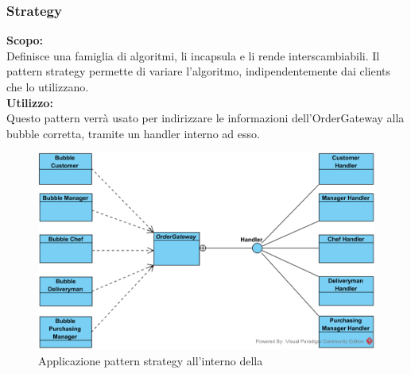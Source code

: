 \subsubsection{Strategy}
\textbf{Scopo:} \\
Definisce una famiglia di algoritmi, li incapsula e li rende interscambiabili. Il pattern strategy permette di variare l'algoritmo, indipendentemente dai clients che lo utilizzano.\\
\textbf{Utilizzo:} \\
Questo pattern verrà usato per indirizzare le informazioni dell'OrderGateway alla bubble corretta, tramite un handler interno ad esso.
\begin{figure}[H]
	\centering
	\includegraphics[width=15cm]{./diagrammi_img/applicazione_pattern/strategy_demo.png}
	\caption{Applicazione pattern strategy all'interno della \DemoName}
\end{figure}